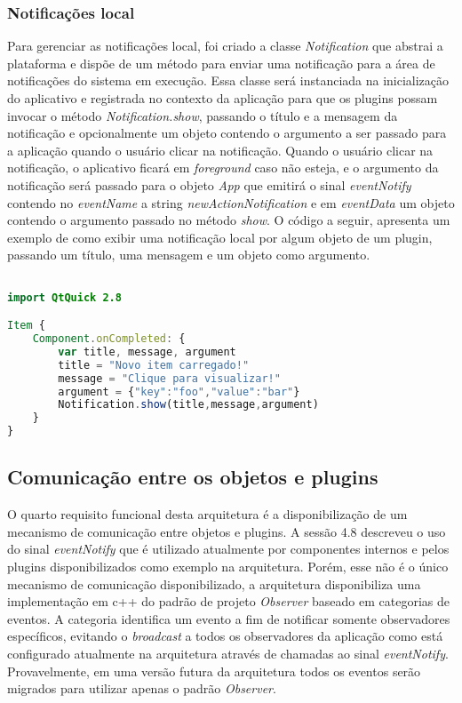 \subsubsection{Notificações local}
Para gerenciar as notificações local, foi criado a classe \textit{Notification} que abstrai a plataforma e dispõe de um método para enviar uma notificação para a área de notificações do sistema em execução. Essa classe será instanciada na inicialização do aplicativo e registrada no contexto da aplicação para que os plugins possam invocar o método \textit{Notification.show}, passando o título e a mensagem da notificação e opcionalmente um objeto contendo o argumento a ser passado para a aplicação quando o usuário clicar na notificação. Quando o usuário clicar na notificação, o aplicativo ficará em \textit{foreground} caso não esteja, e o argumento da notificação será passado para o objeto \textit{App} que emitirá o sinal \textit{eventNotify} contendo no \textit{eventName} a string \textit{newActionNotification} e em \textit{eventData} um objeto contendo o argumento passado no método \textit{show}. O código a seguir, apresenta um exemplo de como exibir uma notificação local por algum objeto de um plugin, passando um título, uma mensagem e um objeto como argumento.

\begin{center}
\begin{lstlisting}[language=qml]

import QtQuick 2.8

Item {
    Component.onCompleted: {
		var title, message, argument
		title = "Novo item carregado!"
		message = "Clique para visualizar!"
		argument = {"key":"foo","value":"bar"}
		Notification.show(title,message,argument)
	}
}
\end{lstlisting}
\end{center}


\subsection{Comunicação entre os objetos e plugins}
O quarto requisito funcional desta arquitetura é a disponibilização de um mecanismo de comunicação entre objetos e plugins.
A sessão 4.8 descreveu o uso do sinal \textit{eventNotify} que é utilizado atualmente por componentes internos e pelos plugins disponibilizados como exemplo na arquitetura. Porém, esse não é o único mecanismo de comunicação disponibilizado, a arquitetura disponibiliza uma implementação em c++ do padrão de projeto \textit{Observer} baseado em categorias de eventos. A categoria identifica um evento a fim de notificar somente observadores específicos, evitando o \textit{broadcast} a todos os observadores da aplicação como está configurado atualmente na arquitetura através de chamadas ao sinal \textit{eventNotify}. Provavelmente, em uma versão futura da arquitetura todos os eventos serão migrados para utilizar apenas o padrão \textit{Observer}.\par

